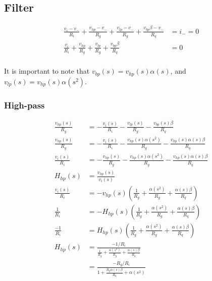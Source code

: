 \documentclass{article}
\begin{document}
\subsection{Filter}

\begin{equation*}
\begin{split}
  \frac{v_i - v_-}{R_i} + \frac{v_{hp} - v_-}{R_g} + \frac{v_{lp} - v_-}{R_g}  + \frac{v_{bp}\beta - v_-}{R_q} & = i_- = 0 \\
  \frac{v_i}{R_i} + \frac{v_{hp}}{R_g} + \frac{v_{lp}}{R_g}  + \frac{v_{bp}\beta}{R_q} & = 0 \\
\end{split}
\end{equation*}

It is important to note that $v_{bp}(s) = v_{hp}(s)\alpha(s)$, and $v_{lp}(s) = v_{hp}(s)\alpha(s^2)$.

\subsubsection{High-pass}

\begin{equation*}
\begin{split}
  \frac{v_{hp}(s)}{R_g} & = - \frac{v_i(s)}{R_i} - \frac{v_{lp}(s)}{R_g} - \frac{v_{bp}(s)\beta}{R_q} \\
  \frac{v_{hp}(s)}{R_g} & = - \frac{v_i(s)}{R_i} - \frac{v_{hp}(s)\alpha(s^2)}{R_g} - \frac{v_{hp}(s)\alpha(s)\beta}{R_q} \\
  \frac{v_i(s)}{R_i} & = - \frac{v_{hp}(s)}{R_g} - \frac{v_{hp}(s)\alpha(s^2)}{R_g} - \frac{v_{hp}(s)\alpha(s)\beta}{R_q} \\
  H_{hp}(s) & = \frac{v_{hp}(s)}{v_i(s)} \\
  \frac{v_i(s)}{R_i} & = - v_{hp}(s)(\frac{1}{R_g} + \frac{\alpha(s^2)}{R_g} + \frac{\alpha(s)\beta}{R_q}) \\
  \frac{1}{R_i} & = - H_{hp}(s)(\frac{1}{R_g} + \frac{\alpha(s^2)}{R_g} + \frac{\alpha(s)\beta}{R_q}) \\
  \frac{-1}{R_i} & = H_{hp}(s)(\frac{1}{R_g} + \frac{\alpha(s^2)}{R_g} + \frac{\alpha(s)\beta}{R_q}) \\
  H_{hp}(s) & = \frac{-1/R_i}{\frac{1}{R_g} + \frac{\alpha(s^2)}{R_g} + \frac{\alpha(s)\beta}{R_q}} \\
  & = \frac{-R_g/R_i}{1 + \frac{R_g\alpha(s)\beta}{R_q} + \alpha(s^2) } \\
\end{split}
\end{equation*}
\end{document}
